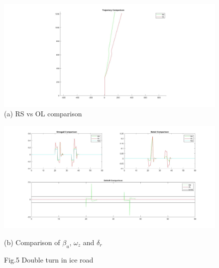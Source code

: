 \begin{figure}[!h]
		\centering
	        \includegraphics[scale=0.3]{./Images/LaneChangeIce/t} 
                \caption{(a)  RS vs OL comparison}
             
	\end{figure}

\begin{figure}[!h]
		\centering
	        \includegraphics[scale=0.45]{./Images/LaneChangeIce/s} 
                \caption{(b) Comparison of $\beta_{u}$, $\omega_{z}$ and $\delta_{r}$} 
                \caption{Fig.5  Double turn in ice road}
        
 \end{figure}



    